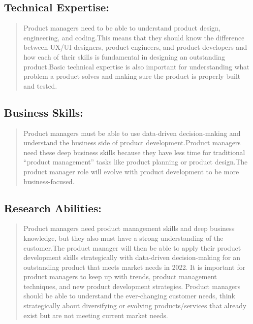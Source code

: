 \documentclass[
]{book}
\begin{document}
\hypertarget{technical-expertise}{%
\subsection*{Technical Expertise:}\label{technical-expertise}}

\begin{quote}
Product managers need to be able to understand product design, engineering, and coding.This means that they should know the difference between UX/UI designers, product engineers, and product developers and how each of their skills is fundamental in designing an outstanding product.Basic technical expertise is also important for understanding what problem a product solves and making sure the product is properly built and tested.
\end{quote}

\hypertarget{business-skills}{%
\subsection*{Business Skills:}\label{business-skills}}

\begin{quote}
Product managers must be able to use data-driven decision-making and understand the business side of product development.Product managers need these deep business skills because they have less time for traditional ``product management'' tasks like product planning or product design.The product manager role will evolve with product development to be more business-focused.
\end{quote}

\hypertarget{research-abilities}{%
\subsection*{Research Abilities:}\label{research-abilities}}

\begin{quote}
Product managers need product management skills and deep business knowledge, but they also must have a strong understanding of the customer.The product manager will then be able to apply their product development skills strategically with data-driven decision-making for an outstanding product that meets market needs in 2022. It is important for product managers to keep up with trends, product management techniques, and new product development strategies. Product managers should be able to understand the ever-changing customer needs, think strategically about diversifying or evolving products/services that already exist but are not meeting current market needs.
\end{quote}
\end{document}
